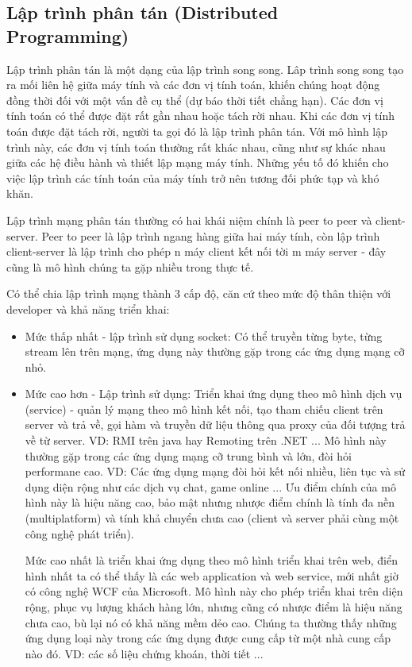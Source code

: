 \documentclass[10pt, a4paper]{article}
\begin{document}
\subsection{Lập trình phân tán (Distributed Programming)}

Lập trình phân tán là một dạng của lập trình song song. Lâp trình song song tạo ra mối liên hệ giữa máy tính và các đơn vị tính toán, khiến chúng hoạt động đồng thời đối với một vấn đề cụ thể (dự báo thời tiết chẳng hạn). Các đơn vị tính toán có thể được đặt rất gần nhau hoặc tách rời nhau. Khi các đơn vị tính toán được đặt tách rời, người ta gọi đó là lập trình phân tán. Với mô hình lập trình này, các đơn vị tính toán thường rất khác nhau, cũng như sự khác nhau giữa các hệ điều hành và thiết lập mạng máy tính. Những yếu tố đó khiến cho việc lập trình các tính toán của máy tính trở nên tương đối phức tạp và khó khăn. 

Lập trình mạng phân tán thường có hai khái niệm chính là peer to peer và client-server. Peer to peer là lập trình ngang hàng giữa hai máy tính, còn lập trình client-server là lập trình cho phép n máy client kết nối tời m máy server - đây cũng là mô hình chúng ta gặp nhiều trong thực tế.

Có thể chia lập trình mạng thành 3 cấp độ, căn cứ theo mức độ thân thiện với developer và khả năng triển khai:
\begin{itemize}
\item Mức thấp nhất - lập trình sử dụng socket: Có thể truyền từng byte, từng stream lên trên mạng, ứng dụng này thường gặp trong các ứng dụng mạng cỡ nhỏ.
\item Mức cao hơn - Lập trình sử dụng: Triển khai ứng dụng theo mô hình dịch vụ (service) - quản lý mạng theo mô hình kết nối, tạo tham chiếu client trên server và trả về, gọi hàm và truyền dữ liệu thông qua proxy của đối tượng trả về từ server. VD: RMI trên java hay Remoting trên .NET ... Mô hình này thường gặp trong các ứng dụng mạng cỡ trung bình và lớn, đòi hỏi performane cao. VD: Các ứng dụng mạng đòi hỏi kết nối nhiều, liên tục và sử dụng diện rộng như các dịch vụ chat, game online ... Ưu điểm chính của mô hình này là hiệu năng cao, bảo mật nhưng nhược điểm chính là tính đa nền (multiplatform) và tính khả chuyển chưa cao (client và server phải cùng một công nghệ phát triển).

Mức cao nhất là triển khai ứng dụng theo mô hình triển khai trên web, điển hình nhất ta có thể thấy là các web application và web service, mới nhất giờ có công nghệ WCF của Microsoft. Mô hình này cho phép triển khai trên diện rộng, phục vụ lượng khách hàng lớn, nhưng cũng có nhược điểm là hiệu năng chưa cao, bù lại nó có khả năng mềm dẻo cao. Chúng ta thường thấy những ứng dụng loại này trong các ứng dụng được cung cấp từ một nhà cung cấp nào đó. VD: các số liệu chứng khoán, thời tiết ...
\end{itemize}
\end{document}

